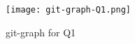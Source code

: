 \documentclass[a4paper]{article} %
\begin{document}
 
 \begin{figure}
 	\texttt{[image: git-graph-Q1.png]}
 	\caption{git-graph for Q1}
 \end{figure}

 
\end{document}
